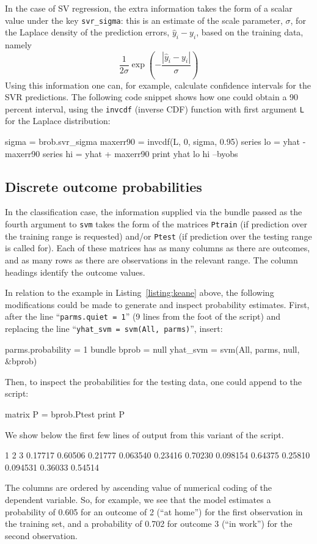 \documentclass{article}
\begin{document}
In the case of SV regression, the extra information takes the
form of a scalar value under the key \texttt{svr\_sigma}: this is an
estimate of the scale parameter, $\sigma$, for the Laplace density of
the prediction errors, $\hat{y}_i - y_i$, based on the training data,
namely
\[
\frac{1}{2\sigma} \exp \left(-\frac{|\hat{y}_i - y_i|}{\sigma}\right)
\]
Using this information one can, for example, calculate confidence
intervals for the SVR predictions. The following code snippet shows
how one could obtain a 90 percent interval, using the \texttt{invcdf}
(inverse CDF) function with first argument \texttt{L} for the Laplace
distribution:
\begin{code}
sigma = brob.svr_sigma
maxerr90 = invcdf(L, 0, sigma, 0.95)
series lo = yhat - maxerr90
series hi = yhat + maxerr90
print yhat lo hi --byobs
\end{code}

\subsection{Discrete outcome probabilities}
\label{sec:SVC-probs}

In the classification case, the information supplied via the bundle
passed as the fourth argument to \texttt{svm} takes the form of the
matrices \texttt{Ptrain} (if prediction over the training range is
requested) and/or \texttt{Ptest} (if prediction over the testing range
is called for). Each of these matrices has as many columns as there
are outcomes, and as many rows as there are observations in the
relevant range. The column headings identify the outcome values.

In relation to the example in Listing~\ref{listing:keane} above, the
following modifications could be made to generate and inspect
probability estimates. First, after the line ``\texttt{parms.quiet =
  1}'' (9 lines from the foot of the script) and replacing the line
``\texttt{yhat\_svm = svm(All, parms)}'', insert:
%
\begin{code}
parms.probability = 1
bundle bprob = null
yhat_svm = svm(All, parms, null, &bprob)
\end{code}
Then, to inspect the probabilities for the testing data, one could
append to the script:
%
\begin{code}
matrix P = bprob.Ptest
print P
\end{code}
%
We show below the first few lines of output from this variant of
the script.
%
\begin{code}
           1            2            3
     0.17717      0.60506      0.21777
    0.063540      0.23416      0.70230
    0.098154      0.64375      0.25810
    0.094531      0.36033      0.54514
\end{code}
%
The columns are ordered by ascending value of numerical coding of the
dependent variable. So, for example, we see that the model estimates a
probability of 0.605 for an outcome of 2 (``at home'') for the first
observation in the training set, and a probability of 0.702 for
outcome 3 (``in work'') for the second observation.
\end{document}
